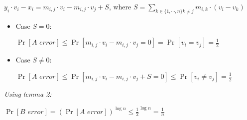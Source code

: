 $y_i\cdot v_i - x_i =  m_{i,j} \cdot v_i - m_{i,j} \cdot v_j + S$, where $S = \sum_{k \in \{1,\cdots,n\} k \neq j} m_{i,k}\cdot (v_i - v_k)$

\begin{itemize}
    \item Case $S = 0$:

    $\operatorname{Pr}[\textit{A error}] \leq  
    \operatorname{Pr}[m_{i,j} \cdot v_i - m_{i,j} \cdot v_j = 0] =
    \operatorname{Pr}[v_i = v_j] =
    \frac{1}{2}$

    \item Case $S \neq 0$:

    $\operatorname{Pr}[\textit{A error}] \leq  
    \operatorname{Pr}[m_{i,j} \cdot v_i - m_{i,j} \cdot v_j + S = 0] \leq
    \operatorname{Pr}[v_i \neq v_j] =
    \frac{1}{2}$
    
\end{itemize}




\textit{Using lemma 2:}

$\operatorname{Pr}[\textit{B error}] =
(\operatorname{Pr}[\textit{A error}])^{\operatorname{log} n} \leq \frac{1}{2}^{\operatorname{log} n} = 
\frac{1}{n}$ 

\pagebreak